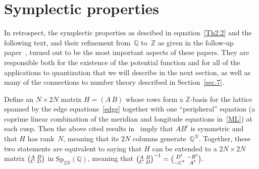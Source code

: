 \documentclass[12pt,reqno]{amsart}
\theoremstyle{definition}
\def\Sp{\mathrm{Sp}}
\def\Z{\mathbb Z}
\def\Q{\mathbb Q}
\def\sma#1#2#3#4{\bigl(\smallmatrix#1&#2\\#3&#4\endsmallmatrix\bigr)}
\def\sma#1#2#3#4{\bigl(\!\smallmatrix#1&#2\\#3&#4\endsmallmatrix\!\bigr)}  %
\begin{document}


\section{Symplectic properties}
\label{sec.5}

In retrospect, the symplectic properties as descibed in equation~\eqref{Th2.2} and the
following text, and their refinement from~$\Q$ to~$\Z$ as given in the follow-up
paper~\cite{N:combinatorics},
turned out to be the most important aspects of these papers.  They are responsible both
for the existence of the potential function and for all of the applications
to quantization that we will describe in the next section, as well as many of the connections
to number theory described in Section~\ref{sec.7}.

Define an $N\times2N$ matrix $H=(A\,B)$ whose rows form a $\Z$-basis for the lattice spanned 
by the edge equations~\eqref{edge} together with one ``peripheral'' equation
(a coprime linear combination of the meridian and longitude equations in~\eqref{ML}) at
each cusp. Then the above cited results in~\cite{NZ} imply that $AB^t$ is symmetric and that
$H$ has rank~$N$, meaning that its $2N$ columns generate~$\Q^N$. Together, these two statements
are equivalent to saying that $H$ can be extended to a $2N\times2N$ matrix $\sma ABCD$ in 
$\Sp_{2N}(\Q)$, meaning that ${\sma ABCD}^{-1}=\sma{D^t}{-B^t}{-C^t}{A^t}$.  
\end{document}
